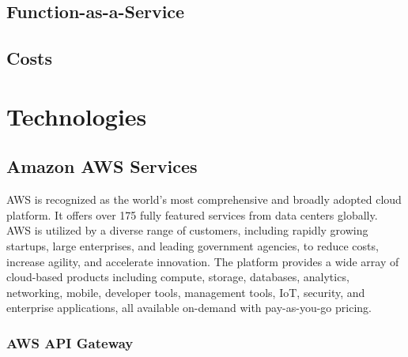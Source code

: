 


\subsection{Function-as-a-Service}

\subsection{Costs}

\section{Technologies}
\subsection{Amazon AWS Services}
AWS is recognized as the world's most comprehensive and broadly adopted cloud platform. It offers
over 175 fully featured services from data centers globally. AWS is utilized by a diverse range of
customers, including rapidly growing startups, large enterprises, and leading government agencies,
to reduce costs, increase agility, and accelerate innovation. The platform provides a wide array of
cloud-based products including compute, storage, databases, analytics, networking, mobile, developer
tools, management tools, IoT, security, and enterprise applications, all available on-demand with
pay-as-you-go pricing.
\subsubsection{AWS API Gateway}
